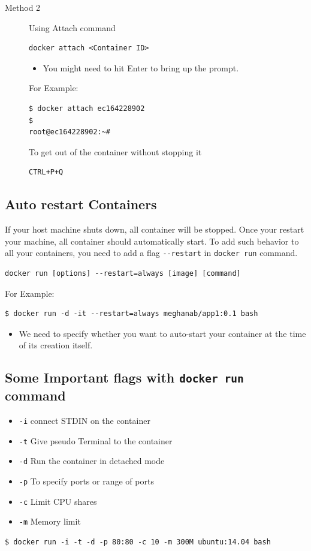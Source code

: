 \documentclass[11pt]{article}
\begin{document}
\begin{description}
\begin{description}
\item[{Method 2}] Using Attach command
\begin{verbatim}
docker attach <Container ID>
\end{verbatim}
\begin{itemize}
\item You might need to hit Enter to bring up the prompt.
\end{itemize}
For Example:
\begin{verbatim}
$ docker attach ec164228902
$
root@ec164228902:~#
\end{verbatim}
\begin{description}
\item[{To get out of the container without stopping it}] 
\end{description}
\begin{verbatim}
CTRL+P+Q
\end{verbatim}
\end{description}
\end{description}

\subsection{Auto restart Containers}
\label{sec:orgheadline18}
If your host machine shuts down, all container will be stopped. Once your
restart your machine, all container should automatically start. To add such
behavior to all your containers, you need to add a flag \texttt{-{}-restart} in
\texttt{docker run} command. 
\begin{verbatim}
docker run [options] --restart=always [image] [command]
\end{verbatim}
For Example:
\begin{verbatim}
$ docker run -d -it --restart=always meghanab/app1:0.1 bash
\end{verbatim}
\begin{itemize}
\item We need to specify whether you want to auto-start your container at the
time of its creation itself.
\end{itemize}

\subsection{Some Important flags with \texttt{docker run} command}
\label{sec:orgheadline19}
\begin{itemize}
\item \texttt{-i}  connect STDIN on the container
\item \texttt{-t}  Give pseudo Terminal to the container
\item \texttt{-d}  Run the container in detached mode
\item \texttt{-p}  To specify ports or range of ports
\item \texttt{-c}  Limit CPU shares
\item \texttt{-m}  Memory limit
\end{itemize}
\begin{verbatim}
$ docker run -i -t -d -p 80:80 -c 10 -m 300M ubuntu:14.04 bash
\end{verbatim}
\end{document}
